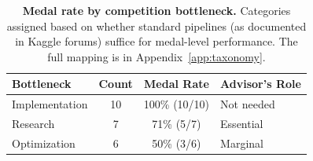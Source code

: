 \documentclass{article}
\begin{document}
\begin{table}[t]
\centering
\caption{\textbf{Medal rate by competition bottleneck.} Categories assigned based on whether standard pipelines (as documented in Kaggle forums) suffice for medal-level performance. The full mapping is in Appendix~\ref{app:taxonomy}.}
\label{tab:taxonomy}
\small
\begin{tabular}{lccl}
\toprule
\textbf{Bottleneck} & \textbf{Count} & \textbf{Medal Rate} & \textbf{Advisor's Role} \\
\midrule
Implementation & 10 & 100\% (10/10) & Not needed \\
Research & 7 & 71\% (5/7) & Essential \\
Optimization & 6 & 50\% (3/6) & Marginal \\
\bottomrule
\end{tabular}
\end{table}
\end{document}
